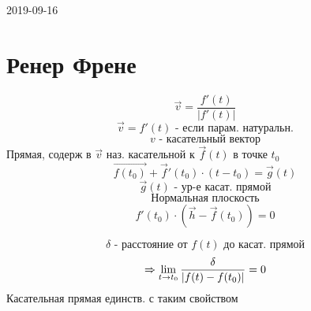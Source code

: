 \documentclass[main, 12pt, fleqn]{subfiles}
\begin{document}
\begin{lect} {2019-09-16}
\section{Ренер Френе}
	\begin{Definition}
		\[\vec{v} = \frac{f'(t)}{|f'(t)|}\]
		\[\vec{v} = f'(t) \text{ - если парам. натуральн.}\]
		\[v \text{ - касательный вектор}\]
		Прямая, содерж в $\vec{v}$ наз. касательной к $\vec{f}(t)$ в точке $t_0$
		\[\vec{f(t_0)} + \vec{f}'(t_0) \cdot (t - t_0) = \vec{g}(t)\]
		\[\vec{g}(t) \text{ - ур-е касат. прямой}\]
		\[\text{Нормальная плоскость}\]
		\[f'(t_0) \cdot (\vec{h} - \vec{f}(t_0)) = 0\]
	\end{Definition}

	\begin{Theorem}
		\[\delta \text{ - расстояние от }f(t) \text{ до касат. прямой}\]
		\[\Rightarrow \lim_{t \to t_0} \frac{\delta}{|f(t) - f(t_0)|} = 0 \]
		Касательная прямая единств. с таким свойством
	\end{Theorem}

	\begin{Proof}
			
	\end{Proof}
\end{lect}
\end{document}
